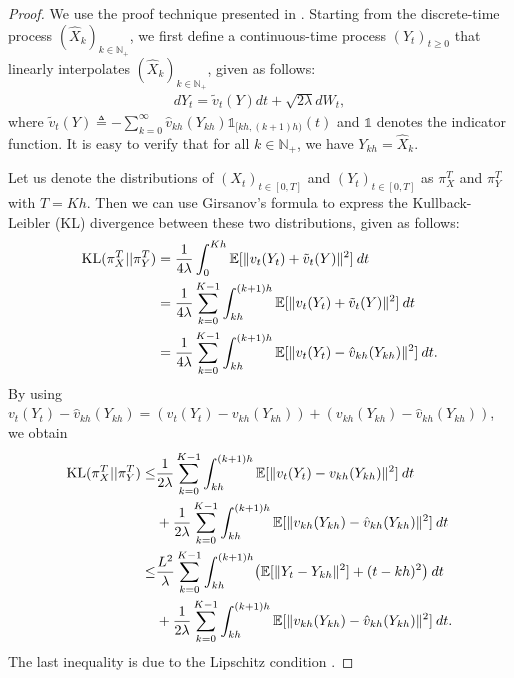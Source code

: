 \begin{proof}
We use the proof technique presented in \cite{dalalyan2017theoretical,raginsky17a}. Starting from the discrete-time process $(\hat{X}_k)_{k\in \mathbb{N}_+}$, we first define a continuous-time process $(Y_t)_{t\geq 0}$ that linearly interpolates $(\hat{X}_k)_{k\in \mathbb{N}_+}$, given as follows: 
\begin{align}
d Y_t = \tilde{v}_t(Y) dt + \sqrt{2 \lambda} dW_t, \label{eqn:sde_linear}
\end{align}
where $\tilde{v}_t(Y) \triangleq - \sum_{k=0}^{\infty} \hat{v}_{kh} (Y_{kh}) \mathds{1}_{[kh, (k+1)h)}(t)$ and $\mathds{1}$ denotes the indicator function. It is easy to verify that for all $k \in \mathbb{N}_+$, we have $Y_{kh} = \hat{X}_k$. 

Let us denote the distributions of $(X_t)_{t \in [0,T]}$ and $(Y_t)_{t \in [0,T]}$ as $\pi_{X}^T$ and $\pi_{Y}^T$ with $T = Kh$. Then we can use Girsanov's formula to express the Kullback-Leibler (KL) divergence between these two distributions, given as follows:
\begin{align}
\textnormal{KL} (\pi_{X}^T || \pi_{Y}^T) &= \frac1{4 \lambda} \int_0^{Kh} \mathbb{E}[ \|v_t(Y_t) + \tilde{v}_t(Y) \|^2 ]  \> dt \\
&= \frac1{4 \lambda} \sum_{k=0}^{K-1} \int_{kh}^{(k+1)h} \mathbb{E}[ \|v_t(Y_t) + \tilde{v}_t(Y) \|^2 ] \> dt \\
&= \frac1{4 \lambda} \sum_{k=0}^{K-1} \int_{kh}^{(k+1)h} \mathbb{E}[ \|v_t(Y_t) - \hat{v}_{kh}(Y_{kh}) \|^2 ] \> dt.
\end{align}
By using $v_t(Y_t) - \hat{v}_{kh}(Y_{kh}) = ( v_t(Y_t) - v_{kh}(Y_{kh})) + ( v_{kh}(Y_{kh}) - \hat{v}_{kh}(Y_{kh}))$, we obtain
%
\begin{align}
\nonumber \textnormal{KL} (\pi_{X}^T || \pi_{Y}^T) \leq& \frac1{2 \lambda} \sum_{k=0}^{K-1} \int_{kh}^{(k+1)h} \mathbb{E}[ \|v_t(Y_t) - {v}_{kh}(Y_{kh}) \|^2 ] \> dt \\
&+  \frac1{2 \lambda} \sum_{k=0}^{K-1} \int_{kh}^{(k+1)h} \mathbb{E}[ \|v_{kh}(Y_{kh}) - \hat{v}_{kh}(Y_{kh}) \|^2 ] \> dt \\
\nonumber \leq& \frac{L^2}{\lambda} \sum_{k=0}^{K-1} \int_{kh}^{(k+1)h} \bigl(\mathbb{E}[ \|Y_t - Y_{kh} \|^2 ] + (t-kh)^2 \bigr)  \> dt \\
&+  \frac1{2 \lambda} \sum_{k=0}^{K-1} \int_{kh}^{(k+1)h} \mathbb{E}[ \|v_{kh}(Y_{kh}) - \hat{v}_{kh}(Y_{kh}) \|^2 ] \> dt . \label{eqn:lem1_proof_interm}
\end{align}
The last inequality is due to the Lipschitz condition .


\end{proof}
